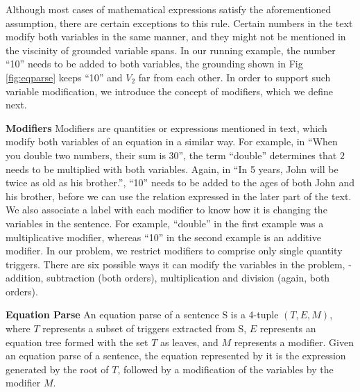   Although most cases of mathematical expressions satisfy the
  aforementioned assumption, there are certain exceptions to this
  rule.  Certain numbers in the text modify both variables in the same
  manner, and they might not be mentioned in the viscinity of grounded
  variable spans. In our running example, the number ``10'' needs to
  be added to both variables, the grounding shown in Fig
  \ref{fig:eqparse} keeps ``10'' and $V_2$ far from each other. In
  order to support such variable modification, we introduce the
  concept of modifiers, which we define next.

  \noindent \textbf{Modifiers} Modifiers are quantities or expressions
  mentioned in text, which modify both variables of an equation in a
  similar way. For example, in ``When you double two numbers, their
  sum is 30'', the term ``double'' determines that $2$ needs to be
  multiplied with both variables. Again, in ``In 5 years, John will be
  twice as old as his brother.'', ``10'' needs to be added to the ages
  of both John and his brother, before we can use the relation
  expressed in the later part of the text. We also associate a label
  with each modifier to know how it is changing the variables in the
  sentence. For example, ``double'' in the first example was a
  multiplicative modifier, whereas ``10'' in the second example is an
  additive modifier. In our problem, we restrict modifiers to comprise
  only single quantity triggers. There are six possible ways it can
  modify the variables in the problem, - addition, subtraction (both
  orders), multiplication and division (again, both orders).

  \noindent \textbf{Equation Parse} An equation parse of a sentence S
  is a 4-tuple $(T, E, M)$, where $T$ represents a subset of triggers
  extracted from S, $E$ represents an equation tree formed with the
  set $T$ as leaves, and $M$ represents a modifier. Given an equation
  parse of a sentence, the equation represented by it is the
  expression generated by the root of $T$, followed by a modification
  of the variables by the modifier $M$.



